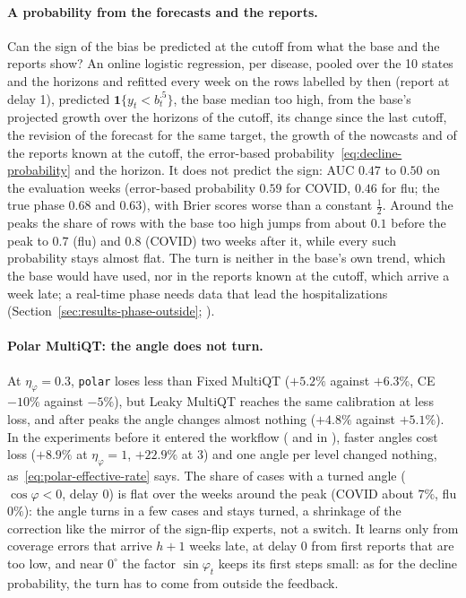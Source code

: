 \documentclass[11pt,a4paper]{article}
\newcommand{\ind}{\mathbf{1}}
\theoremstyle{definition}
\theoremstyle{remark}
\begin{document}
\paragraph{A probability from the forecasts and the reports.} Can the
sign of the bias be predicted at the cutoff from what the base and the
reports show? An online logistic regression, per disease, pooled over the
10 states and the horizons and refitted every week on the rows labelled by
then (report at delay 1), predicted $\ind\{y_t<b_t^{.5}\}$, the base median
too high, from the base's projected growth over the horizons of the cutoff,
its change since the last cutoff, the revision of the forecast for the
same target, the growth of the nowcasts and of the reports known at the
cutoff, the error-based probability~\eqref{eq:decline-probability} and the
horizon. It does not predict the sign: AUC $0.47$ to $0.50$ on the
evaluation weeks (error-based probability $0.59$ for COVID, $0.46$ for flu;
the true phase $0.68$ and $0.63$), with Brier scores worse than a constant
$\frac12$. Around the peaks the share of rows with the base too high jumps
from about $0.1$ before the peak to $0.7$ (flu) and $0.8$ (COVID) two weeks
after it, while every such probability stays almost flat. The turn is
neither in the base's own trend, which the base would have used, nor in
the reports known at the cutoff, which arrive a week late; a real-time
phase needs data that lead the hospitalizations
(Section~\ref{sec:results-phase-outside};
).

\paragraph{Polar MultiQT: the angle does not turn.} At
$\eta_\varphi=0.3$, \texttt{polar} loses less than Fixed MultiQT
($+5.2\%$ against $+6.3\%$, CE $-10\%$ against $-5\%$), but Leaky MultiQT
reaches the same calibration at less loss, and after peaks the angle
changes almost nothing ($+4.8\%$ against $+5.1\%$). In the experiments
before it entered the workflow ( and
 in ), faster angles cost
loss ($+8.9\%$ at $\eta_\varphi=1$, $+22.9\%$ at 3) and one angle per level
changed nothing, as~\eqref{eq:polar-effective-rate} says. The share of
cases with a turned angle ($\cos\varphi<0$, delay 0) is flat over the weeks
around the peak (COVID about $7\%$, flu $0\%$): the angle turns in a few
cases and stays turned, a shrinkage of the correction like the mirror of
the sign-flip experts, not a switch. It learns only from coverage errors
that arrive $h+1$ weeks late, at delay 0 from first reports that are too
low, and near $0^\circ$ the factor $\sin\varphi_t$ keeps its first steps
small: as for the decline probability, the turn has to come from outside
the feedback.
\end{document}

